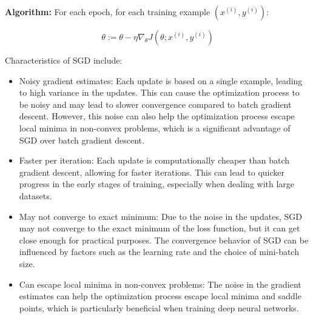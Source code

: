 \documentclass[
  letterpaper,
  DIV=11,
  numbers=noendperiod]{scrreprt}
\begin{document}
\textbf{Algorithm:} For each epoch, for each training example
\((x^{(i)}, y^{(i)})\):

\[
\theta := \theta - \eta \nabla_\theta J(\theta; x^{(i)}, y^{(i)})
\]

Characteristics of SGD include:

\begin{itemize}
\item
  Noisy gradient estimates: Each update is based on a single example,
  leading to high variance in the updates. This can cause the
  optimization process to be noisy and may lead to slower convergence
  compared to batch gradient descent. However, this noise can also help
  the optimization process escape local minima in non-convex problems,
  which is a significant advantage of SGD over batch gradient descent.
\item
  Faster per iteration: Each update is computationally cheaper than
  batch gradient descent, allowing for faster iterations. This can lead
  to quicker progress in the early stages of training, especially when
  dealing with large datasets.
\item
  May not converge to exact minimum: Due to the noise in the updates,
  SGD may not converge to the exact minimum of the loss function, but it
  can get close enough for practical purposes. The convergence behavior
  of SGD can be influenced by factors such as the learning rate and the
  choice of mini-batch size.
\item
  Can escape local minima in non-convex problems: The noise in the
  gradient estimates can help the optimization process escape local
  minima and saddle points, which is particularly beneficial when
  training deep neural networks.
\end{itemize}
\end{document}
